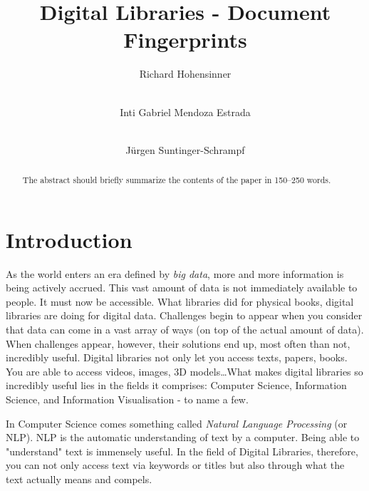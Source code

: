 \documentclass[runningheads]{llncs}
\begin{document}
%
\title{Digital Libraries - Document Fingerprints}%
%
%

\author{Richard Hohensinner \and \\
Inti Gabriel Mendoza Estrada \and     \\
Jürgen Suntinger-Schrampf}

%

\maketitle              %

\begin{abstract}
The abstract should briefly summarize the contents of the paper in
150--250 words.

\end{abstract}
%
%
%

\section{Introduction}
As the world enters an era defined by \textit{big data}, more and more information is being actively accrued. This vast amount of data is not immediately available to people. It must now be accessible. What libraries did for physical books, digital libraries are doing for digital data. Challenges begin to appear when you consider that data can come in a vast array of ways (on top of the actual amount of data). When challenges appear, however, their solutions end up, most often than not, incredibly useful. Digital libraries not only let you access texts, papers, books. You are able to access videos, images, 3D models\ldots What makes digital libraries so incredibly useful lies in the fields it comprises: Computer Science, Information Science, and Information Visualisation - to name a few. 

In Computer Science comes something called \textit{Natural Language Processing} (or NLP). NLP is the automatic understanding of text by a computer. Being able to "understand" text is immensely useful. In the field of Digital Libraries, therefore, you can not only access text via keywords or titles but also through what the text actually means and compels.
\end{document}
